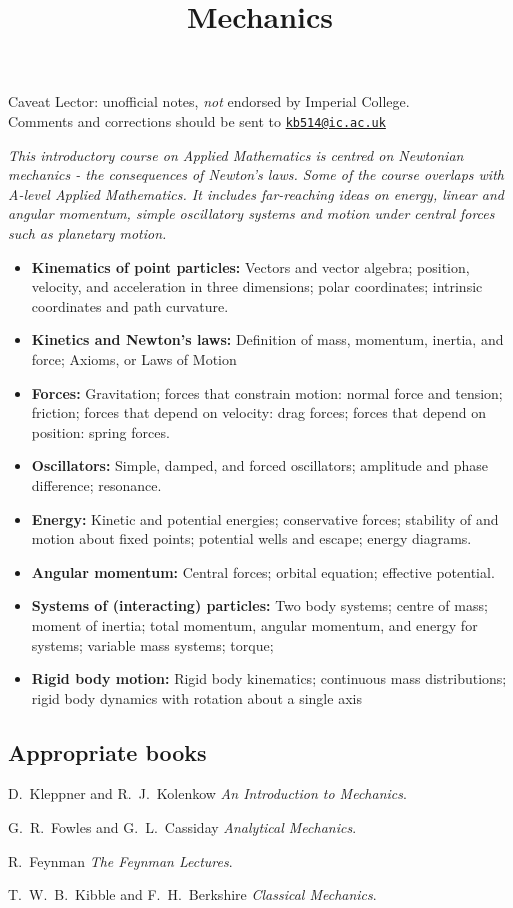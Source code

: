 \documentclass[twoside]{scrartcl}
\title{Mechanics}
\begin{document}
{
Caveat Lector: unofficial notes, \emph{not} endorsed by Imperial College.\\[0.1cm]
Comments and corrections should be sent to \href{mailto:kb514@ic.ac.uk}{\texttt{kb514@ic.ac.uk}}
}
{
{\Large\bfseries{}}

\textit{This introductory course on Applied Mathematics is centred on Newtonian mechanics - the consequences of Newton’s laws. Some of the course overlaps with A-level Applied Mathematics. It includes far-reaching ideas on energy, linear and angular momentum, simple oscillatory systems and motion under central forces such as planetary motion.}

\begin{itemize}
\item \textbf{Kinematics of point particles:} Vectors and vector algebra; position, velocity, and acceleration in three dimensions; polar coordinates; intrinsic coordinates and path curvature.
\item \textbf{Kinetics and Newton's laws:} Definition of mass, momentum, inertia, and force; Axioms, or Laws of Motion
\item \textbf{Forces:} Gravitation; forces that constrain motion: normal force and tension; friction; forces that depend on velocity: drag forces; forces that depend on position: spring forces. 
\item \textbf{Oscillators:} Simple, damped, and forced oscillators; amplitude and phase difference; resonance.
\item \textbf{Energy:} Kinetic and potential energies; conservative forces; stability of and motion about fixed points; potential wells and escape; energy diagrams.
\item \textbf{Angular momentum:} Central forces; orbital equation; effective potential.
\item \textbf{Systems of (interacting) particles:} Two body systems; centre of mass; moment of inertia; total momentum, angular momentum, and energy for systems; variable mass systems; torque;
\item \textbf{Rigid body motion:} Rigid body kinematics; continuous mass distributions; rigid body dynamics with rotation about a single axis
\end{itemize}

\subsection*{Appropriate books}

{\shortskip
D.~Kleppner and R.~J.~Kolenkow \emph{An Introduction to Mechanics}.

G.~R.~Fowles and G.~L.~Cassiday \emph{Analytical Mechanics}.

R.~Feynman \emph{The Feynman Lectures}.

T.~W.~B.~Kibble and F.~H.~Berkshire \emph{Classical Mechanics}.

}}

\TableofContents

\end{document}
